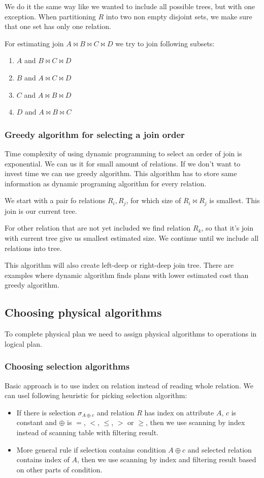 We do it the same way like we wanted to include all possible trees, but with one exception. When partitioning $R$ into two non empty disjoint sets, we make sure that one set has only one relation.

For estimating join $A\Join B\Join C\Join D$ we try to join following subsets:
\begin{enumerate}
\item $A$ and $B\Join C\Join D$
\item $B$ and $A\Join C\Join D$
\item $C$ and $A\Join B\Join D$
\item $D$ and $A\Join B\Join C$
\end{enumerate}

\subsubsection{Greedy algorithm for selecting a join order}
\label{greedyalgorithm}
Time complexity of using dynamic programming to select an order of join is exponential. We can us it for small amount of relations. If we don't want to invest time we can use greedy algorithm. This algorithm has to store same information as dynamic programing algorithm for every relation.

We start with a pair fo relations $R_i, R_j$, for which size of $R_i \Join R_j$ is smallest. This join is our current tree.

For other relation that are not yet included we find relation $R_k$, so that it's join with current tree give us smallest estimated size. We continue until we include all relations into tree. 

This algorithm will also create left-deep or right-deep join tree. There are examples where dynamic algorithm finds plans with lower estimated cost than greedy algorithm.
 
\subsection{Choosing physical algorithms}

To complete physical plan we need to assign physical algorithms to operations in logical plan.
\subsubsection{Choosing selection algorithms}

Basic approach is to use index on relation instead of reading whole relation. We can usel following heuristic for picking selection algorithm: 
\begin{itemize}
\item If there is selection $\sigma_{A\oplus c}$ and relation $R$ has index on attribute $A$, $c$ is constant and $\oplus$ is $=$, $<$, $\leq$, $>$ or $\geq$, then we use scanning by index instead of scanning table with filtering result.
\item More general rule if selection contains condition $A\oplus c$ and selected relation contains index of $A$, then we use scanning by index and filtering result based on other parts of condition.
\end{itemize}

